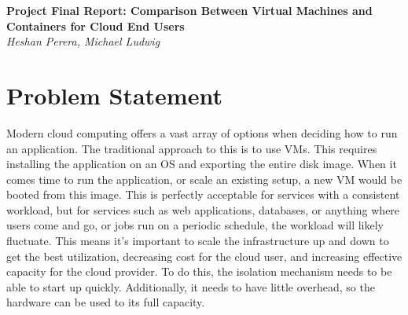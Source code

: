 \documentclass[11pt]{article}
\begin{document}
\renewcommand{\headrulewidth}{0pt} 
\renewcommand{\footrulewidth}{0pt} 
\pagestyle{fancy}
\cfoot{}
\lhead{}
\rhead{}
\lfoot{\itshape\textcolor{gray}{CS525T Cloud Computing Final Report}}

\begin{center}
{\LARGE \bf Project Final Report: Comparison Between Virtual Machines and Containers for Cloud End Users} \\
{\normalsize \emph{Heshan Perera, Michael Ludwig}}\\
\end{center}



\section{Problem Statement}

Modern cloud computing offers a vast array of options when deciding how to run an application. The traditional approach to this is to use VMs. This requires installing the application on an OS and exporting the entire disk image. When it comes time to run the application, or scale an existing setup, a new VM would be booted from this image. This is perfectly acceptable for services with a consistent workload, but for services such as web applications, databases, or anything where users come and go, or jobs run on a periodic schedule, the workload will likely fluctuate. This means it's important to scale the infrastructure up and down to get the best utilization, decreasing cost for the cloud user, and increasing effective capacity for the cloud provider. To do this, the isolation mechanism needs to be able to start up quickly. Additionally, it needs to have little overhead, so the hardware can be used to its full capacity.
\end{document}
